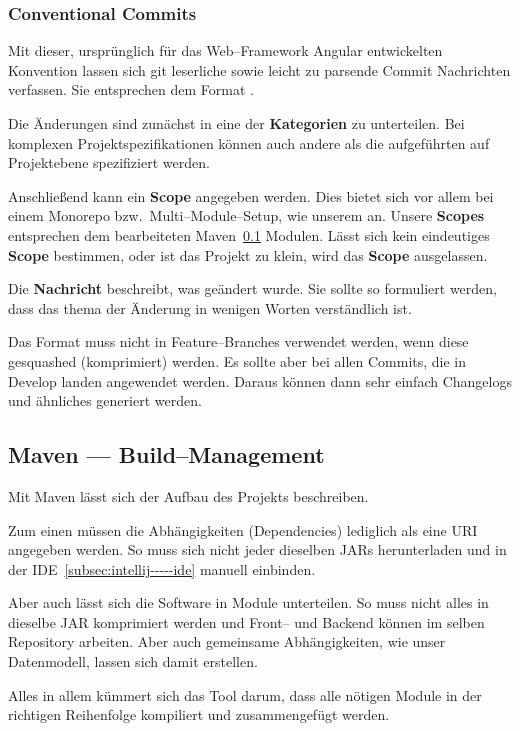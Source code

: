 \subsubsection{Conventional Commits}\label{subsubsec:conventional-commits}
Mit dieser, ursprünglich für das Web--Framework Angular entwickelten Konvention lassen sich git leserliche sowie leicht zu parsende Commit Nachrichten verfassen.
Sie entsprechen dem Format .


Die Änderungen sind zunächst in eine der \textbf{Kategorien} zu unterteilen.
Bei komplexen Projektspezifikationen können auch andere als die aufgeführten auf Projektebene spezifiziert werden.


Anschließend kann ein \textbf{Scope} angegeben werden.
Dies bietet sich vor allem bei einem Monorepo bzw.\ Multi--Module--Setup, wie unserem an.
Unsere \textbf{Scopes} entsprechen dem bearbeiteten Maven~\ref{subsec:maven-----build--management} Modulen.
Lässt sich kein eindeutiges \textbf{Scope} bestimmen, oder ist das Projekt zu klein, wird das \textbf{Scope} ausgelassen.


Die \textbf{Nachricht} beschreibt, was geändert wurde.
Sie sollte so formuliert werden, dass das thema der Änderung in wenigen Worten verständlich ist.


Das Format muss nicht in Feature--Branches verwendet werden, wenn diese gesquashed (komprimiert) werden.
Es sollte aber bei allen Commits, die in Develop landen angewendet werden.
Daraus können dann sehr einfach Changelogs und ähnliches generiert werden.


\subsection{Maven --- Build--Management}\label{subsec:maven-----build--management}
Mit Maven lässt sich der Aufbau des Projekts beschreiben.


Zum einen müssen die Abhängigkeiten (Dependencies) lediglich als eine URI angegeben werden.
So muss sich nicht jeder dieselben JARs herunterladen und in der IDE~\ref{subsec:intellij-----ide} manuell einbinden.


Aber auch lässt sich die Software in Module unterteilen.
So muss nicht alles in dieselbe JAR komprimiert werden und Front-- und Backend können im selben Repository arbeiten.
Aber auch gemeinsame Abhängigkeiten, wie unser Datenmodell, lassen sich damit erstellen.


Alles in allem kümmert sich das Tool darum, dass alle nötigen Module in der richtigen Reihenfolge kompiliert und zusammengefügt werden.



